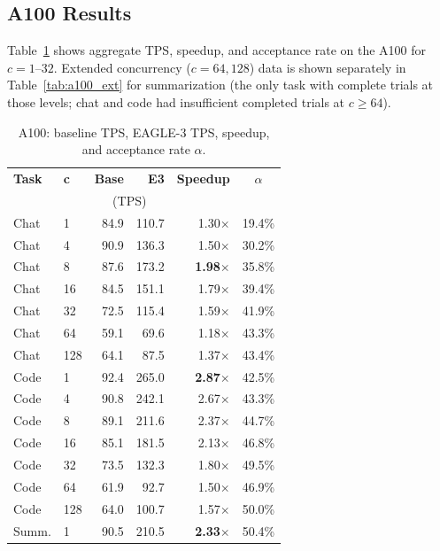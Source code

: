 \documentclass[10pt,twocolumn]{article}
\begin{document}
\subsection{A100 Results}

Table~\ref{tab:a100} shows aggregate TPS, speedup, and acceptance rate on the A100
for $c = 1$--$32$.  Extended concurrency ($c = 64, 128$) data is shown separately
in Table~\ref{tab:a100_ext} for summarization (the only task with complete trials
at those levels; chat and code had insufficient completed trials at $c \geq 64$).

\begin{table}[h]
\centering
\caption{A100: baseline TPS, EAGLE-3 TPS, speedup, and acceptance rate $\alpha$.}
\label{tab:a100}
\small
\setlength{\tabcolsep}{4pt}
\begin{tabular}{llrrrc}
\toprule
\textbf{Task} & \textbf{c} & \textbf{Base} & \textbf{E3} & \textbf{Speedup} & $\alpha$ \\
              &            & \multicolumn{2}{c}{(TPS)} & & \\
\midrule
Chat & 1  & 84.9  & 110.7 & 1.30$\times$ & 19.4\% \\
Chat & 4  & 90.9  & 136.3 & 1.50$\times$ & 30.2\% \\
Chat & 8  & 87.6  & 173.2 & \textbf{1.98}$\times$ & 35.8\% \\
Chat & 16 & 84.5  & 151.1 & 1.79$\times$ & 39.4\% \\
Chat & 32 & 72.5  & 115.4 & 1.59$\times$ & 41.9\% \\
\rowcolor{gray!15}
Chat & 64  & 59.1  & 69.6  & 1.18$\times$ & 43.3\% \\
\rowcolor{gray!15}
Chat & 128 & 64.1  & 87.5  & 1.37$\times$ & 43.4\% \\
\midrule
Code & 1  & 92.4  & 265.0 & \textbf{2.87}$\times$ & 42.5\% \\
Code & 4  & 90.8  & 242.1 & 2.67$\times$ & 43.3\% \\
Code & 8  & 89.1  & 211.6 & 2.37$\times$ & 44.7\% \\
Code & 16 & 85.1  & 181.5 & 2.13$\times$ & 46.8\% \\
Code & 32 & 73.5  & 132.3 & 1.80$\times$ & 49.5\% \\
\rowcolor{gray!15}
Code & 64  & 61.9  & 92.7  & 1.50$\times$ & 46.9\% \\
\rowcolor{gray!15}
Code & 128 & 64.0  & 100.7 & 1.57$\times$ & 50.0\% \\
\midrule
Summ. & 1  & 90.5  & 210.5 & \textbf{2.33}$\times$ & 50.4\% \\

\end{tabular}
\end{table}
\end{document}
